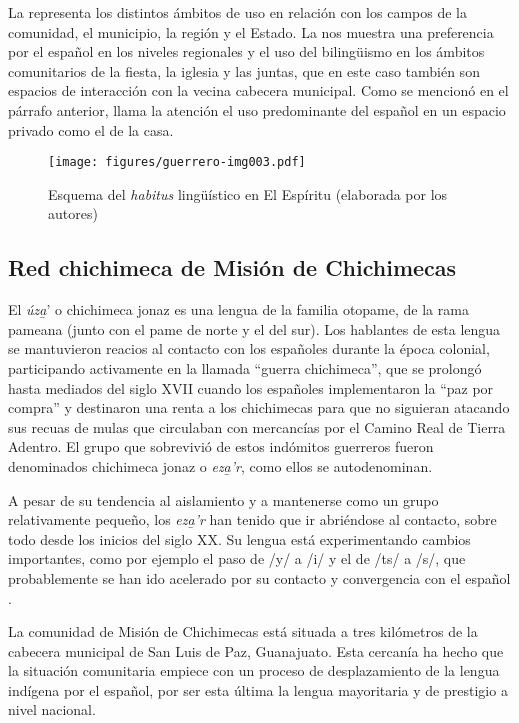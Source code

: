 \documentclass[output=paper]{../langscibook}
\begin{document}
La  representa los distintos ámbitos de uso en relación con los campos de la comunidad, el municipio, la región y el Estado. La  nos muestra una preferencia por el español en los niveles regionales y el uso del bilingüismo en los ámbitos comunitarios de la fiesta, la iglesia y las juntas, que en este caso también son espacios de interacción con la vecina cabecera municipal. Como se mencionó en el párrafo anterior, llama la atención el uso predominante del español en un espacio privado como el de la casa.


\begin{figure}
\texttt{[image: figures/guerrero-img003.pdf]}
\caption{\label{fig:guerrero:3} Esquema del \textit{habitus} lingüístico en El Espíritu (elaborada por los autores)}
\end{figure}



 \subsection{Red chichimeca de Misión de Chichimecas}



El \textit{úza̱}’ o chichimeca jonaz es una lengua de la familia otopame, de la rama pameana (junto con el pame de norte y el del sur). Los hablantes de esta lengua se mantuvieron reacios al contacto con los españoles durante la época colonial, participando activamente en la llamada “guerra chichimeca”, que se prolongó hasta mediados del siglo XVII cuando los españoles implementaron la “paz por compra” y destinaron una renta a los chichimecas para que no siguieran atacando sus recuas de mulas que circulaban con mercancías por el Camino Real de Tierra Adentro. El grupo que sobrevivió de estos indómitos guerreros fueron denominados chichimeca jonaz o \textit{eza̱’r}, como ellos se autodenominan.

A pesar de su tendencia al aislamiento y a mantenerse como un grupo relativamente pequeño, los \textit{eza̱’r} han tenido que ir abriéndose al contacto, sobre todo desde los inicios del siglo XX. Su lengua está experimentando cambios importantes, como por ejemplo el paso de /y/ a /i/ y el de /ts/ a /s/, que probablemente se han ido acelerado por su contacto y convergencia con el español \citep{GuerreroGalvánEtAl2017}.

La comunidad de Misión de Chichimecas está situada a tres kilómetros de la cabecera municipal de San Luis de Paz, Guanajuato. Esta cercanía ha hecho que la situación comunitaria empiece con un proceso de desplazamiento de la lengua indígena por el español, por ser esta última la lengua mayoritaria y de prestigio a nivel nacional.
\end{document}

